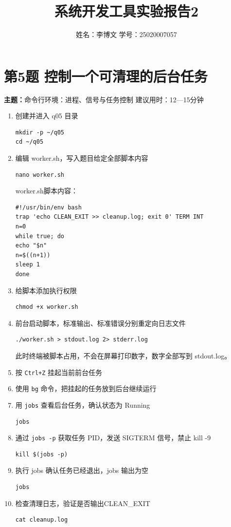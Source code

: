 \documentclass[11pt,a4paper]{article}
\title{系统开发工具实验报告2}
\author{姓名：李博文 \qquad 学号：25020007057}
\date{}
\begin{document}
\maketitle

\section*{第5题 控制一个可清理的后台任务}
\textbf{主题：}命令行环境：进程、信号与任务控制 \quad 建议用时：12—15分钟

\begin{enumerate}
\item 创建并进入 q05 目录
\begin{lstlisting}
mkdir -p ~/q05
cd ~/q05
\end{lstlisting}

\item 编辑 worker.sh，写入题目给定全部脚本内容
\begin{lstlisting}
nano worker.sh
\end{lstlisting}
worker.sh脚本内容：
\begin{lstlisting}
#!/usr/bin/env bash
trap 'echo CLEAN_EXIT >> cleanup.log; exit 0' TERM INT
n=0
while true; do
echo "$n"
n=$((n+1))
sleep 1
done
\end{lstlisting}

\item 给脚本添加执行权限
\begin{lstlisting}
chmod +x worker.sh
\end{lstlisting}

\item 前台启动脚本，标准输出、标准错误分别重定向日志文件
\begin{lstlisting}
./worker.sh > stdout.log 2> stderr.log
\end{lstlisting}
此时终端被脚本占用，不会在屏幕打印数字，数字全部写到 stdout.log。

\item 按 \texttt{Ctrl+Z} 挂起当前前台任务

\item 使用 \texttt{bg} 命令，把挂起的任务放到后台继续运行

\item 用 \texttt{jobs} 查看后台任务，确认状态为 Running
\begin{lstlisting}
jobs
\end{lstlisting}

\item 通过 \texttt{jobs -p} 获取任务 PID，发送 SIGTERM 信号，禁止 kill -9
\begin{lstlisting}
kill $(jobs -p)
\end{lstlisting}

\item 执行 jobs 确认任务已经退出，jobs 输出为空
\begin{lstlisting}
jobs
\end{lstlisting}

\item 检查清理日志，验证是否输出CLEAN\_EXIT
\begin{lstlisting}
cat cleanup.log
\end{lstlisting}
\end{enumerate}
\end{document}
